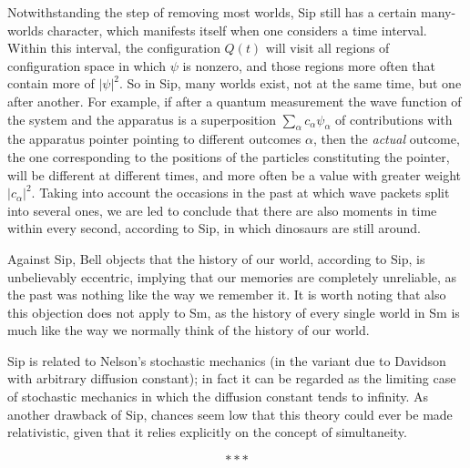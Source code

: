\documentclass[12pt]{article}
\begin{document}
Notwithstanding the step of removing most worlds, Sip still has a certain many-worlds character, which manifests itself when one considers a time interval. Within this interval, the configuration $Q(t)$ will visit all regions of configuration space in which $\psi$ is nonzero, and those regions more often that contain more of $|\psi|^2$. So in Sip, many worlds exist, not at the same time, but one after another. For example, if after a quantum measurement the wave function of the system and the apparatus is a superposition $\sum_\alpha c_\alpha \psi_\alpha$ of contributions with the apparatus pointer pointing to different outcomes $\alpha$, then the \emph{actual} outcome, the one corresponding to the positions of the particles constituting the pointer, will be different at different times, and more often be a value with greater weight $|c_\alpha|^2$. Taking into account the occasions in the past at which wave packets split into several ones, we are led to conclude that there are also moments in time within every second, according to Sip, in which dinosaurs are still around.

Against Sip, Bell objects that the history of our world, according to Sip, is unbelievably eccentric, implying that our memories are completely unreliable, as the past was nothing like the way we remember it. It is worth noting that also this objection does not apply to Sm, as the history of every single world in Sm is much like the way we normally think of the history of our world.

Sip is related to Nelson's stochastic mechanics \cite{stochmech1,stochmech2} (in the variant due to Davidson \cite{Dav79} with arbitrary diffusion constant); in fact it can be regarded as the limiting case of stochastic mechanics in which the diffusion constant tends to infinity. As another drawback of Sip, chances seem low that this theory could ever be made relativistic, given that it relies explicitly on the concept of simultaneity. 

\[***\]
\end{document}
